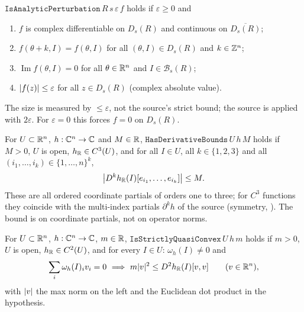 \begin{definition}\label{bpN:p0:pert}
$\texttt{IsAnalyticPerturbation}\,R\,s\,\varepsilon\,f$ holds if $\varepsilon\ge0$ and
\begin{enumerate}[label=(\roman*)]
\item $f$ is complex differentiable on $D_s(R)$ and continuous on $\overline{D_s(R)}$;
\item $f(\theta+k,I)=f(\theta,I)$ for all $(\theta,I)\in D_s(R)$ and $k\in\mathbb{Z}^n$;
\item $\operatorname{Im}f(\theta,I)=0$ for all $\theta\in\mathbb{R}^n$ and $I\in\mathcal B_s(R)$;
\item $\lvert f(z)\rvert\le\varepsilon$ for all $z\in D_s(R)$ (complex absolute value).
\end{enumerate}
The size is measured by $\le\varepsilon$, not the source's strict bound; the source is applied with $2\varepsilon$.
For $\varepsilon=0$ this forces $f=0$ on $D_s(R)$.
\end{definition}

\begin{definition}\label{bpN:p0:bm}
For $U\subset\mathbb{R}^n$, $h:\mathbb{C}^n\to\mathbb{C}$ and $M\in\mathbb{R}$, $\texttt{HasDerivativeBounds}\,U\,h\,M$ holds if $M>0$, $U$ is open,
$h_{\mathbb{R}}\in C^3(U)$, and for all $I\in U$, all $k\in\{1,2,3\}$ and all $(i_1,\dots,i_k)\in\{1,\dots,n\}^k$,
\[\bigl\lvert D^kh_{\mathbb{R}}(I)[e_{i_1},\dots,e_{i_k}]\bigr\rvert\le M.\]
These are all ordered coordinate partials of orders one to three; for $C^3$ functions they coincide with the multi-index
partials $\partial^kh$ of the source (symmetry, ). The bound is on coordinate partials, not
on operator norms.
\end{definition}

\begin{definition}\label{bpN:p0:qc}
For $U\subset\mathbb{R}^n$, $h:\mathbb{C}^n\to\mathbb{C}$, $m\in\mathbb{R}$, $\texttt{IsStrictlyQuasiConvex}\,U\,h\,m$ holds if $m>0$, $U$ is open,
$h_{\mathbb{R}}\in C^2(U)$, and for every $I\in U$: $\omega_h(I)\ne0$ and
\[\sum_i\omega_h(I)_iv_i=0\ \Longrightarrow\ m\abs v^2\le D^2h_\R(I)[v,v]\qquad(v\in\R^n),\]
with $\lvert v\rvert$ the max norm on the left and the Euclidean dot product in the hypothesis.
\end{definition}

